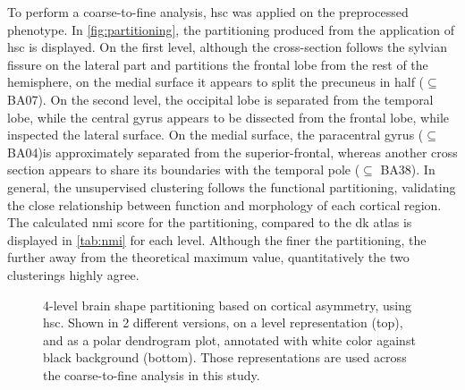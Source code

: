 To perform a coarse-to-fine analysis,  \ac{hsc} was applied on the preprocessed phenotype. In \autoref{fig:partitioning}, the partitioning produced from the application of \ac{hsc} is displayed. On the first level, although the cross-section follows the sylvian fissure on the lateral part and partitions the frontal lobe from the rest of the hemisphere, on the medial surface it appears to split the precuneus in half ($\subseteq$ BA07). On the second level, the occipital lobe is separated from the temporal lobe, while the central gyrus appears to be dissected from the frontal lobe, while inspected the lateral surface. On the medial surface, the paracentral gyrus ($\subseteq$ BA04)is approximately separated from the superior-frontal, whereas another cross section appears to share its boundaries with the temporal pole ($\subseteq$ BA38). In general, the unsupervised clustering follows the functional partitioning, validating the close relationship  between function and morphology of each cortical region. The calculated \ac{nmi} score for the partitioning, compared to the \ac{dk} atlas is displayed in \autoref{tab:nmi} for each level. Although the finer the partitioning, the further away from the theoretical maximum value, quantitatively the two clusterings highly agree.

\begin{figure}[H]
	\begin{adjustwidth}{-4cm}{-4cm}
	\centering
	\subfloat[]{
		
	}\quad
	\subfloat[]{
		
	}

\end{adjustwidth}
\caption[4-level brain shape partitioning based on asymmetry]{4-level brain shape partitioning based on cortical asymmetry, using \ac{hsc}. Shown in 2 different versions, on a level representation (top), and as a polar dendrogram plot, annotated with white color against black background (bottom). Those representations are used across the coarse-to-fine analysis in this study.}
\label{fig:partitioning}
\end{figure}

